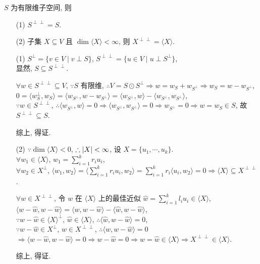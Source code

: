\documentclass{note}
\begin{document}
\begin{thm}[(课本定理 9.12)]
    $S$ 为有限维子空间, 则
    \begin{itemize}
        \item[(1)] $S^{\perp\perp}=S$.
        \item[(2)] 子集 $X\subseteq V$ 且 $\dim\langle X\rangle<\infty$, 则 $X^{\perp\perp}=\langle X\rangle$.
    \end{itemize}
\end{thm}
\begin{pf}
    \begin{itemize}
        \item[(1)] $S^{\perp}=\{v\in V\mid v\perp S\}$, $S^{\perp\perp}=\{u\in V\mid u\perp S^{\perp}\}$,\\
        显然, $S\subseteq S^{\perp\perp}$.

        $\forall w\in S^{\perp\perp}\subseteq V$, $\because S$ 有限维, $\therefore V=S\odot S^{\perp}\Longrightarrow w=w_S+w_{S^{\perp}}\Longrightarrow w_S=w-w_{S^{\perp}}$,\\
        $0=\langle w_S^{\perp},w_S\rangle=\langle w_{S^{\perp}},w-w_{S^{\perp}}\rangle=\langle w_{S^{\perp}},w\rangle-\langle w_{S^{\perp}},w_{S^{\perp}}\rangle$,\\
        $\because w\in S^{\perp\perp}$, $\therefore\langle w_{S^{\perp}},w\rangle=0\Longrightarrow\langle w_{S^{\perp}},w_{S^{\perp}}\rangle=0\Longrightarrow w_{S^{\perp}}=0\Longrightarrow w=w_S\in S$, 故 $S^{\perp\perp}\subseteq S$.

        综上, 得证.
        \item[(2)] $\because\dim\langle X\rangle<0$, $\therefore\left\lvert X\right\rvert<\infty$, 设 $X=\{u_1,\cdots,u_k\}$.\\
        $\forall w_1\in\langle X\rangle$, $w_1=\sum_{i=1}^kr_iu_i$,\\
        $\forall w_2\in X^{\perp}$, $\langle w_1,w_2\rangle=\langle\sum_{i=1}^kr_iu_i,w_2\rangle=\sum_{i=1}^kr_i\langle u_i,w_2\rangle=0\Longrightarrow\langle X\rangle\subseteq X^{\perp\perp}$.

        $\forall w\in X^{\perp\perp}$, 令 $w$ 在 $\langle X\rangle$ 上的最佳近似 $\hat{w}=\sum_{i=1}^kl_iu_i\in\langle X\rangle$,\\
        $\langle w-\hat{w},w-\hat{w}\rangle=\langle w,w-\hat{w}\rangle-\langle\hat{w},w-\hat{w}\rangle$,\\
        $\because w-\hat{w}\in\langle X\rangle^{\perp}$, $\hat{w}\in\langle X\rangle$, $\therefore\langle\hat{w},w-\hat{w}\rangle=0$,\\
        $\because w-\hat{w}\in X^{\perp}$, $w\in X^{\perp\perp}$, $\therefore\langle w,w-\hat{w}\rangle=0$\\
        $\Longrightarrow\langle w-\hat{w},w-\hat{w}\rangle=0\Longrightarrow w-\hat{w}=0\Longrightarrow w=\hat{w}\in\langle X\rangle\Longrightarrow X^{\perp\perp}\in\langle X\rangle$.

        综上, 得证.
    \end{itemize}
\end{pf}
\end{document}
